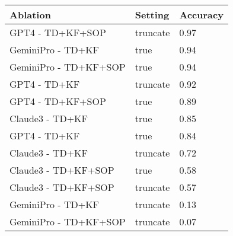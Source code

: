 \begin{tabular}{lll}
\toprule
Ablation & Setting & Accuracy \\
\midrule
GPT4 - TD+KF+SOP & truncate & 0.97 \\
GeminiPro - TD+KF & true & 0.94 \\
GeminiPro - TD+KF+SOP & true & 0.94 \\
GPT4 - TD+KF & truncate & 0.92 \\
GPT4 - TD+KF+SOP & true & 0.89 \\
Claude3 - TD+KF & true & 0.85 \\
GPT4 - TD+KF & true & 0.84 \\
Claude3 - TD+KF & truncate & 0.72 \\
Claude3 - TD+KF+SOP & true & 0.58 \\
Claude3 - TD+KF+SOP & truncate & 0.57 \\
GeminiPro - TD+KF & truncate & 0.13 \\
GeminiPro - TD+KF+SOP & truncate & 0.07 \\
\bottomrule
\end{tabular}
